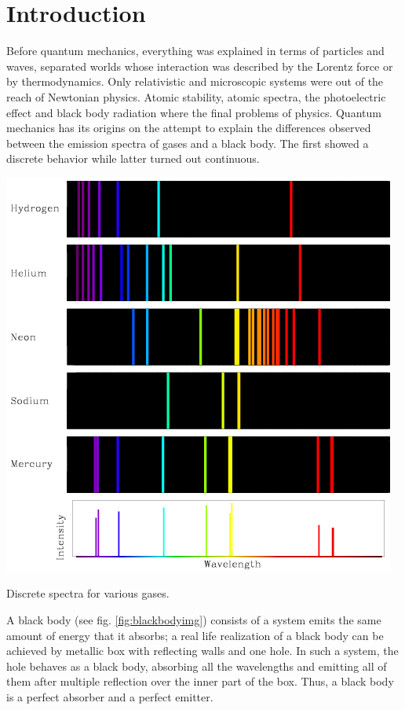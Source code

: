\documentclass{article}
\begin{document}
\section{Introduction}
Before quantum mechanics, everything was explained in terms of particles and waves, separated worlds whose interaction was described by the Lorentz force or by thermodynamics. Only relativistic and microscopic systems were out of the reach of Newtonian physics. Atomic stability, atomic spectra, the photoelectric effect and black body radiation where the final problems of physics. Quantum mechanics has its origins on the attempt to explain the differences observed between the emission spectra of gases and a black body. The first showed a discrete behavior while latter turned out continuous. 
\begin{marginfigure}%
  \includegraphics[width=\linewidth]{figures/lec19_elements}
  \caption{Discrete spectra for various gases.}
  \label{fig:gasesspect}
\end{marginfigure}
A black body (see fig. \ref{fig:blackbodyimg}) consists of a system emits the same amount of energy that it absorbs; a real life realization of a black body can be achieved by metallic box with reflecting walls and one hole. In such a system, the hole behaves as a black body, absorbing all the wavelengths and emitting all of them after multiple reflection over the inner part of the box. Thus, a black body is a perfect absorber and a perfect emitter.
\end{document}
